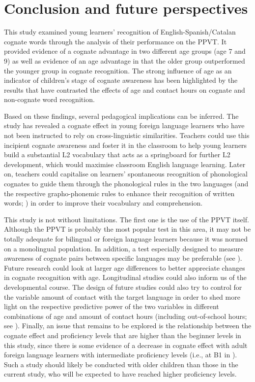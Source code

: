 \documentclass[output=paper,modfonts,nonflat,newtxmath]{langsci/langscibook}
\begin{document}
\section{{Conclusion} \textbf{and} \textbf{future} \textbf{perspectives}}

This study examined young learners’ recognition of English-Spanish/Catalan cognate words through the analysis of their performance on the PPVT. It provided evidence of a cognate advantage in two different age groups (age 7 and 9) as well as evidence of an age advantage in that the older group outperformed the younger group in cognate recognition. The strong influence of age as an indicator of children’s stage of cognate awareness has been highlighted by the results that have contrasted the effects of age and contact hours on cognate and non-cognate word recognition.

 {Based on these findings, several pedagogical implications can be inferred. The study has revealed a cognate effect in young foreign language learners who have not been instructed to rely on cross-linguistic similarities. Teachers could use this incipient cognate awareness and foster it in the classroom to help young learners build a substantial L2 vocabulary that acts as a springboard for further L2 development, which would maximise classroom English language learning. Later on, teachers could capitalise on learners’ spontaneous recognition of phonological cognates to guide them through the phonological rules in the two languages (and the respective grapho-phonemic rules to enhance their recognition of written words; \citealt{LázaroIbarrola2010}) in order to improve their vocabulary and comprehension.}

 {This study is not without limitations. The first one is the use of the PPVT itself. Although the PPVT is probably the most popular test in this area, it may not be totally adequate for bilingual or foreign language learners because it was normed on a monolingual population. In addition, a test especially designed to measure awareness of cognate pairs between specific languages may be preferable (see \citealt{GoriotEtAl2018,LeśniewskaEtAl2018}). Future research could look at larger age differences to better appreciate changes in cognate recognition with age. Longitudinal studies could also inform us of the developmental course. The design of future studies could also try to control for the variable amount of contact with the target language in order to shed more light on the respective predictive power of the two variables in different combinations of age and amount of contact hours (including out-of-school hours; see \citealt{MuñozEtAl2018}).  Finally, an issue that remains to be explored is the relationship between the cognate effect and proficiency levels that are higher than the beginner levels in this study, since there is some evidence of a decrease in cognate effect with adult foreign language learners with intermediate proficiency levels (i.e., at B1 in \citealt{CasaponsaEtAl2015}). Such a study should likely be conducted with older children than those in the current study, who will be expected to have reached higher proficiency levels.}
\end{document}
